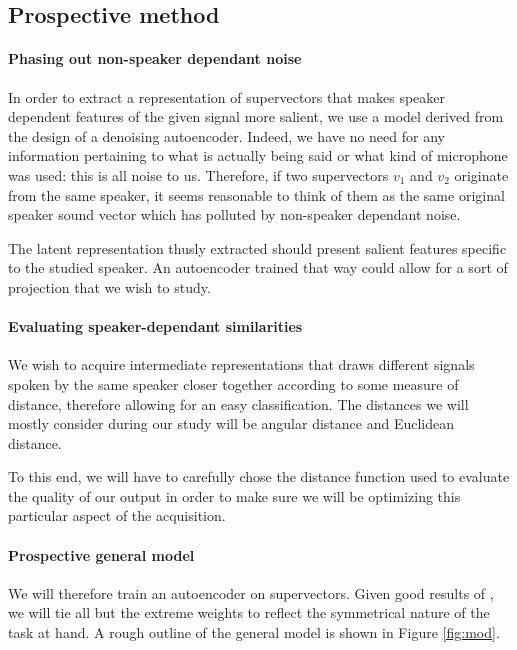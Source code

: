 \documentclass[conference]{IEEEtran}
\begin{document}
\subsection{Prospective method}
\label{subsec:prosp}

\paragraph{Phasing out non-speaker dependant noise}

In order to extract a representation of supervectors that makes speaker
dependent features of the given signal more salient, we use a model derived from
the design of a denoising autoencoder. Indeed, we have no need for any
information pertaining to what is actually being said or what kind of microphone
was used: this is all noise to us. Therefore, if two supervectors $v_1$ and $v_2$ originate from
the same speaker, it seems reasonable to think of them as the same original \og
speaker\fg{} sound vector which has polluted by non-speaker dependant noise.

The latent representation thusly extracted should present salient features
specific to the studied speaker. An autoencoder trained that way could allow for
a sort of projection that we wish to study.

\paragraph{Evaluating speaker-dependant similarities}

We wish to acquire intermediate representations that draws different signals
spoken by the same speaker closer together according to some measure of
distance, therefore allowing for an easy classification. The distances we will
mostly consider during our study will be angular distance and Euclidean
distance.

To this end, we will have to carefully chose the distance function used to
evaluate the \og quality\fg{} of our output in order to make sure we will be
optimizing this particular aspect of the acquisition.

\paragraph{Prospective general model}

We will therefore train an autoencoder on supervectors. Given good results of
\cite{vukotic:hal-01314302}, we will tie all but the extreme weights to reflect the
symmetrical nature of the task at hand. A rough outline of the general model is
shown in Figure \ref{fig:mod}.
\end{document}

